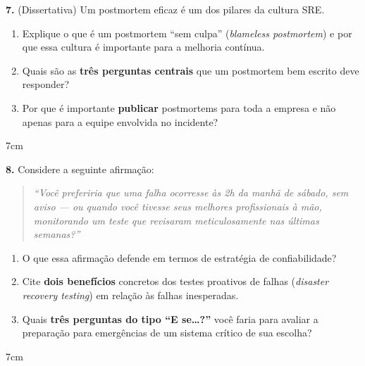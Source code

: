 \documentclass[12pt,a4paper]{report}
\begin{document}
\vspace{0.5cm}

\textbf{7.} (Dissertativa) Um postmortem eficaz é um dos pilares da cultura SRE.

\begin{enumerate}[label=\alph*)]
  \item Explique o que é um postmortem ``sem culpa'' (\textit{blameless postmortem})
        e por que essa cultura é importante para a melhoria contínua.
  \item Quais são as \textbf{três perguntas centrais} que um postmortem bem escrito
        deve responder?
  \item Por que é importante \textbf{publicar} postmortems para toda a empresa e não
        apenas para a equipe envolvida no incidente?
\end{enumerate}
\begin{resposta}{7cm}
\end{resposta}

\vspace{0.5cm}

\textbf{8.} Considere a seguinte afirmação:

\begin{quote}
  \textit{``Você preferiria que uma falha ocorresse às 2h da manhã de sábado, sem aviso
  — ou quando você tivesse seus melhores profissionais à mão, monitorando um teste
  que revisaram meticulosamente nas últimas semanas?''}
\end{quote}

\begin{enumerate}[label=\alph*)]
  \item O que essa afirmação defende em termos de estratégia de confiabilidade?
  \item Cite \textbf{dois benefícios} concretos dos testes proativos de falhas
        (\textit{disaster recovery testing}) em relação às falhas inesperadas.
  \item Quais \textbf{três perguntas do tipo ``E se\ldots?''} você faria para avaliar
        a preparação para emergências de um sistema crítico de sua escolha?
\end{enumerate}
\begin{resposta}{7cm}
\end{resposta}
\end{document}
